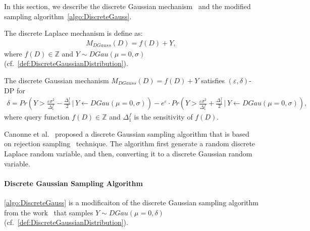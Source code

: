    In this section, we describe the discrete Gaussian mechanism~\cite{canonne2020discrete} and the modified sampling algorithm~\autoref{algo:DiscreteGauss}.

    The discrete Laplace mechanism is define as:
    \begin{equation}
        \begin{split}
            M_{DGauss}\left(D\right)=f\left(D\right)+Y,
        \end{split}
    \end{equation}
    where $f\left(D\right)\in \mathbb{Z} $ and $Y\sim DGau \left(\mu=0,\sigma\right)$ (cf.~\autoref{def:DiscreteGaussianDistribution}).

    \begin{theorem}
        The discrete Gaussian mechanism $M_{DGauss}\left(D\right)=f\left(D\right)+Y$ satisfies $\left(\varepsilon,\delta\right) $-DP for
        \begin{equation}
            \begin{split}
                \delta = Pr\left(Y > \frac{\varepsilon \sigma^2}{\Delta_1^{f}}-\frac{\Delta_1^{f}}{2}\,|\,Y\gets DGau\left(\mu=0,\sigma\right) \right)-e^{\varepsilon} \cdot Pr\left(Y > \frac{\varepsilon \sigma^2}{\Delta_1^{f}}+\frac{\Delta_1^{f}}{2}\,|\,Y\gets DGau\left(\mu=0,\sigma\right) \right),
            \end{split}
        \end{equation}
        where query function $f\left(D\right)\in\mathbb{Z} $ and $\Delta_1^{f}$ is the sensitivity of $f\left(D\right) $.
    \end{theorem}

    Canonne et al.~\cite{canonne2020discrete} proposed a discrete Gaussian sampling algorithm that is based on rejection sampling~\cite{casella2004generalized} technique. The algorithm first generate a random discrete Laplace random variable, and then, converting it to a discrete Gaussian random variable.



    \paragraph{Discrete Gaussian Sampling Algorithm}
    \label{para:DiscreteGaussianSamplingAlgorithm}
    \autoref{algo:DiscreteGauss} is a modificaiton of the discrete Gaussian sampling algorithm from the work~\cite{canonne2020discrete} that samples $Y\sim DGau\left( \mu=0,\delta\right)$ (cf.~\autoref{def:DiscreteGaussianDistribution}).

